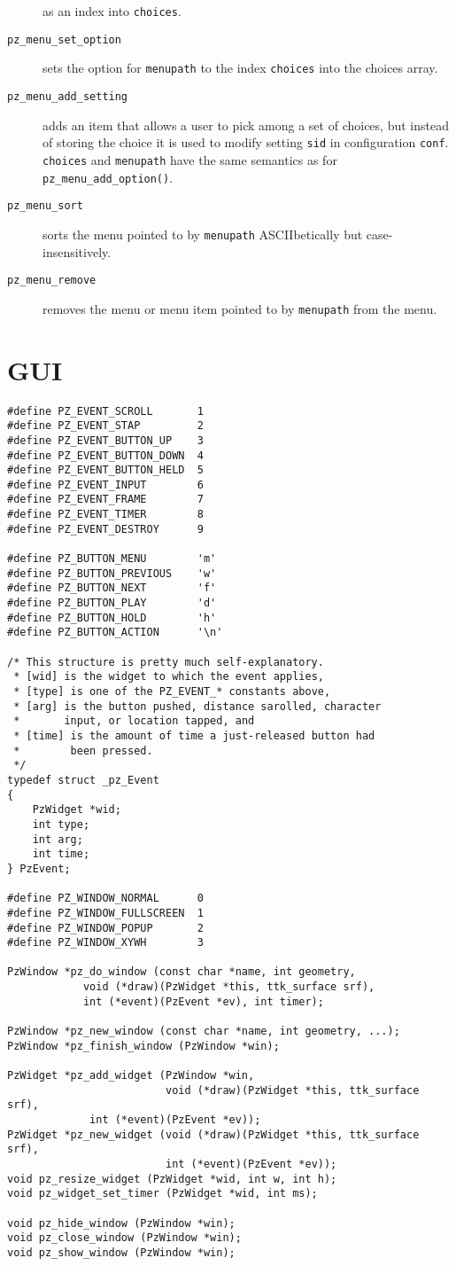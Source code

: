 \documentclass[12pt,letterpaper]{report}
\let\ttt\tt
\def\tt{\def\_{{\ttt\char`\_}}\ttt}
\begin{document}
\begin{description}
as an index into \verb|choices|.
\item[{\tt pz_menu_set_option}] sets the option for \verb|menupath| to the index \verb|choices|
into the choices array.
\item[{\tt pz_menu_add_setting}] adds an item that allows a user to pick among a set of choices,
but instead of storing the choice it is used to modify setting \verb|sid| in configuration
\verb|conf|. \verb|choices| and \verb|menupath| have the same semantics as for \verb|pz_menu_add_option()|.
\item[{\tt pz_menu_sort}] sorts the menu pointed to by \verb|menupath| ASCIIbetically but case-insensitively.
\item[{\tt pz_menu_remove}] removes the menu or menu item pointed to by \verb|menupath| from the menu.
\end{description}

\section{GUI}
\begin{verbatim}
#define PZ_EVENT_SCROLL       1
#define PZ_EVENT_STAP         2
#define PZ_EVENT_BUTTON_UP    3
#define PZ_EVENT_BUTTON_DOWN  4
#define PZ_EVENT_BUTTON_HELD  5
#define PZ_EVENT_INPUT        6
#define PZ_EVENT_FRAME        7
#define PZ_EVENT_TIMER        8
#define PZ_EVENT_DESTROY      9

#define PZ_BUTTON_MENU        'm'
#define PZ_BUTTON_PREVIOUS    'w'
#define PZ_BUTTON_NEXT        'f'
#define PZ_BUTTON_PLAY        'd'
#define PZ_BUTTON_HOLD        'h'
#define PZ_BUTTON_ACTION      '\n'

/* This structure is pretty much self-explanatory.
 * [wid] is the widget to which the event applies,
 * [type] is one of the PZ_EVENT_* constants above,
 * [arg] is the button pushed, distance sarolled, character
 *       input, or location tapped, and
 * [time] is the amount of time a just-released button had
 *        been pressed.
 */
typedef struct _pz_Event
{
    PzWidget *wid;
    int type;
    int arg;
    int time;
} PzEvent;

#define PZ_WINDOW_NORMAL      0
#define PZ_WINDOW_FULLSCREEN  1
#define PZ_WINDOW_POPUP       2
#define PZ_WINDOW_XYWH        3

PzWindow *pz_do_window (const char *name, int geometry,
			void (*draw)(PzWidget *this, ttk_surface srf),
			int (*event)(PzEvent *ev), int timer);

PzWindow *pz_new_window (const char *name, int geometry, ...);
PzWindow *pz_finish_window (PzWindow *win);

PzWidget *pz_add_widget (PzWindow *win,
                         void (*draw)(PzWidget *this, ttk_surface srf),
			 int (*event)(PzEvent *ev));
PzWidget *pz_new_widget (void (*draw)(PzWidget *this, ttk_surface srf),
                         int (*event)(PzEvent *ev));
void pz_resize_widget (PzWidget *wid, int w, int h);
void pz_widget_set_timer (PzWidget *wid, int ms);

void pz_hide_window (PzWindow *win);
void pz_close_window (PzWindow *win);
void pz_show_window (PzWindow *win);
\end{verbatim}
\end{document}
